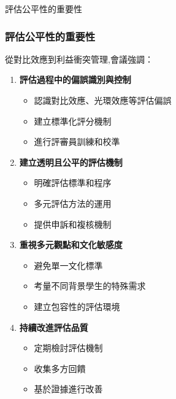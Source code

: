 \documentclass[aspectratio=169]{beamer}
\begin{document}
\begin{frame}{評估公平性的重要性}
\frametitle{評估公平性的重要性}

從對比效應到利益衝突管理,會議強調：

\begin{enumerate}
    \item \textbf{評估過程中的偏誤識別與控制}
    \begin{itemize}
        \item 認識對比效應、光環效應等評估偏誤
        \item 建立標準化評分機制
        \item 進行評審員訓練和校準
    \end{itemize}
    
    \item \textbf{建立透明且公平的評估機制}
    \begin{itemize}
        \item 明確評估標準和程序
        \item 多元評估方法的運用
        \item 提供申訴和複核機制
    \end{itemize}
    
    \item \textbf{重視多元觀點和文化敏感度}
    \begin{itemize}
        \item 避免單一文化標準
        \item 考量不同背景學生的特殊需求
        \item 建立包容性的評估環境
    \end{itemize}
    
    \item \textbf{持續改進評估品質}
    \begin{itemize}
        \item 定期檢討評估機制
        \item 收集多方回饋
        \item 基於證據進行改善
    \end{itemize}
\end{enumerate}
\end{frame}
\end{document}
